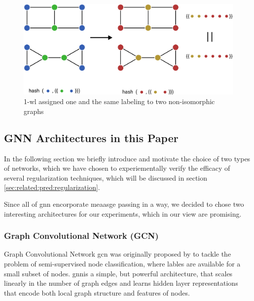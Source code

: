 \begin{figure}[ht]
    \centering
    \includegraphics[width= 0.90\linewidth]{gfx/related-work/1wl-indistinguishable}
    \caption{1-\ac{wl} assigned one and the same labeling to two non-isomorphic graphs~\cite{Liu2022}}\label{fig:related:1-wl-indistinguishable}
\end{figure}


\subsection{GNN Architectures in this Paper}
\label{sec:related:architectures}


In the following section we briefly introduce and
motivate the choice of two types of networks, which we have
chosen to experiementally verify the efficacy of several regularization techniques, which will be
discussed in section \cref{sec:related:pred:regularization}.

Since all of \ac{gnn} encorporate meaasge passing in a way, we decided to chose two interesting
architectures for our experiments, which in our view are promising.
\subsubsection{Graph Convolutional Network (GCN)}
\label{sec:related:architectures:gcn}
Graph Convolutional Network \ac{gcn} was originally proposed by \citet{Kipf2017} to tackle
the problem of semi-supervised node classification, where lables are available for a small subset of
nodes. \ac{gnn}is a simple, but powerful architecture, that scales linearly in the number of graph
edges and learns hidden layer representations that encode both local graph structure and features of nodes.

